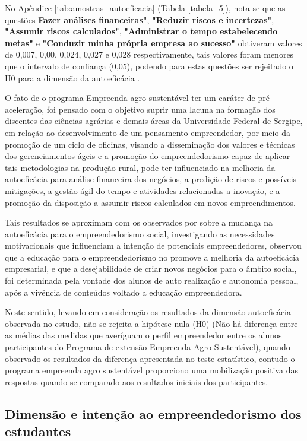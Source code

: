 No Apêndice \ref{tab:amostras_autoeficacia} (Tabela \ref{tabela_5}), nota-se que as questões \textbf{Fazer análises financeiras"}, \textbf{"Reduzir riscos e incertezas"}, \textbf{"Assumir riscos calculados"}, \textbf{"Administrar o tempo estabelecendo metas"} e \textbf{"Conduzir minha própria empresa ao sucesso"} obtiveram valores de 0,007, 0,00, 0,024, 0,027 e 0,028 respectivamente, tais valores foram menores que o intervalo de confiança (0,05), podendo para estas questões ser rejeitado o H0 para a dimensão da autoeficácia . 


O fato de o programa Empreenda agro sustentável ter um caráter de pré-aceleração, foi pensado com o objetivo suprir uma lacuna na formação dos discentes das ciências agrárias e demais áreas da Universidade Federal de Sergipe, em relação ao desenvolvimento de um pensamento empreendedor, por meio da promoção de um ciclo de oficinas, visando a disseminação dos valores e técnicas dos gerenciamentos ágeis e a promoção do empreendedorismo capaz de aplicar tais metodologias na produção rural, pode ter influenciado na melhoria da autoeficácia para análise financeira dos negócios, a predição de riscos e possíveis mitigações, a gestão ágil do tempo e atividades relacionadas a inovação, e a promoção da disposição a assumir riscos calculados em novos empreendimentos. 

Tais resultados se aproximam com os observados por  sobre a mudança na autoeficácia para o empreendedorismo social, investigando as necessidades motivacionais que influenciam a intenção de potenciais empreendedores, observou que a educação para o empreendedorismo no promove a melhoria da autoeficácia empresarial, e que a desejabilidade de criar novos negócios para o âmbito social, foi determinada pela vontade dos alunos de auto realização e autonomia pessoal, após a vivência de conteúdos voltado a educação empreendedora. 

Neste sentido, levando em consideração os resultados da dimensão autoeficácia observada no estudo, não se rejeita a hipótese nula (H0) (Não há diferença entre as médias das medidas que averíguam o perfil empreendedor entre os alunos participantes do Programa de extensão Empreenda Agro Sustentável), quando observado os resultados da diferença apresentada no teste estatístico, contudo o programa empreenda agro sustentável proporciono uma mobilização positiva das respostas quando se comparado aos resultados iniciais dos participantes.


\subsection{Dimensão e intenção ao empreendedorismo dos estudantes}

